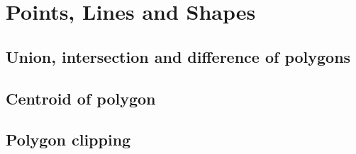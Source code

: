 \documentclass[12pt,openany,a4,usenames,dvipsnames]{book}
\begin{document}
\part{Points, Lines and Shapes}
\chapter{Union, intersection and difference of polygons}
\skelpar%
\chapter{Centroid of polygon}
\skelpar%
\chapter{Polygon clipping}%
\skelpar%
\end{document}
